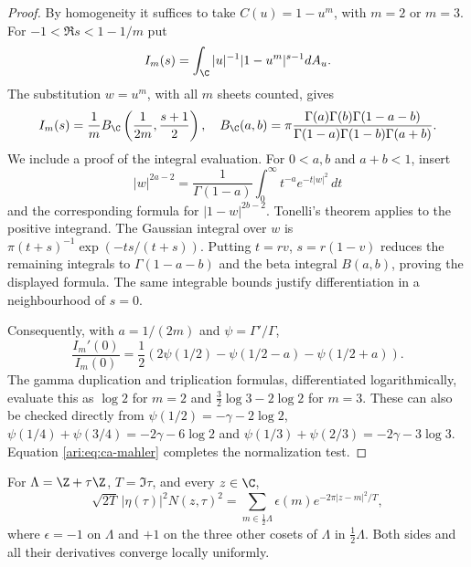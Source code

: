 \begin{proof}
By homogeneity it suffices to take $C(u)=1-u^m$, with $m=2$
or $m=3$. For $-1<\Re s<1-1/m$ put
\[
 I_m(s)=\int_{\C} |u|^{-1}|1-u^m|^{s-1}dA_u.
\]
The substitution $w=u^m$, with all $m$ sheets counted, gives
\[
 I_m(s)=\frac1m B_{\C}\left(\frac1{2m},\frac{s+1}2\right),
 \quad
 B_{\C}(a,b)=\pi\frac{\Gamma(a)\Gamma(b)\Gamma(1-a-b)}
                   {\Gamma(1-a)\Gamma(1-b)\Gamma(a+b)}.
\]
We include a proof of the integral evaluation. For
$0<a,b$ and $a+b<1$, insert
\[
 |w|^{2a-2}=\frac1{\Gamma(1-a)}
       \int_0^\infty t^{-a}e^{-t|w|^2}\,dt
\]
and the corresponding formula for $|1-w|^{2b-2}$.
Tonelli's theorem applies to the positive integrand. The
Gaussian integral over $w$ is
$\pi(t+s)^{-1}\exp(-ts/(t+s))$.
Putting $t=rv$, $s=r(1-v)$ reduces the remaining integrals
to $\Gamma(1-a-b)$ and the beta integral $B(a,b)$, proving
the displayed formula. The same integrable bounds justify
differentiation in a neighbourhood of $s=0$.

Consequently, with $a=1/(2m)$ and $\psi=\Gamma'/\Gamma$,
\[
 \frac{I_m'(0)}{I_m(0)}
 =\frac12\left(2\psi(1/2)-\psi(1/2-a)-\psi(1/2+a)\right).
\]
The gamma duplication and triplication formulas, differentiated
logarithmically, evaluate this as $\log2$ for $m=2$ and
$\frac32\log3-2\log2$ for $m=3$. These can also be checked
directly from
$\psi(1/2)=-\gamma-2\log2$,
$\psi(1/4)+\psi(3/4)=-2\gamma-6\log2$ and
$\psi(1/3)+\psi(2/3)=-2\gamma-3\log3$.
Equation \eqref{ari:eq:ca-mahler} completes the normalization test.
\end{proof}

\begin{proposition}\label{ari:C.8.8}
For $\Lambda=\Z+\tau\Z$, $T=\Im\tau$, and every $z\in\C$,
\[
 \sqrt{2T}\,|\eta(\tau)|^2N(z,\tau)^2
 =\sum_{m\in\frac12\Lambda}\epsilon(m)
                         e^{-2\pi|z-m|^2/T},
\]
where $\epsilon=-1$ on $\Lambda$ and $+1$ on the three other
cosets of $\Lambda$ in $\frac12\Lambda$.
Both sides and all their derivatives converge locally uniformly.
\end{proposition}


